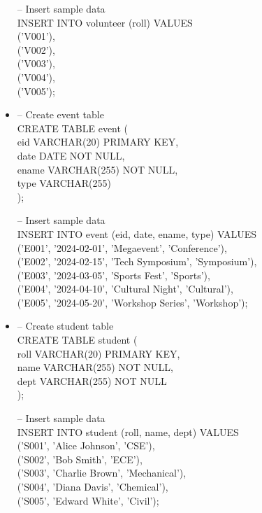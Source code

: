 \documentclass[7pt]{article}
\begin{document}
\begin{itemize}
    -- Insert sample data   \\
    INSERT INTO volunteer (roll) VALUES \\
        ('V001'),   \\
        ('V002'),   \\
        ('V003'),   \\
        ('V004'),   \\
        ('V005');
    
    \item -- Create event table \\
    CREATE TABLE event (    \\
        eid VARCHAR(20) PRIMARY KEY,    \\
        date DATE NOT NULL, \\
        ename VARCHAR(255) NOT NULL,    \\
        type VARCHAR(255)   \\
    );  \vspace{2pt}
    
    -- Insert sample data   \\
    INSERT INTO event (eid, date, ename, type) VALUES   \\
        ('E001', '2024-02-01', 'Megaevent', 'Conference'),  \\
        ('E002', '2024-02-15', 'Tech Symposium', 'Symposium'),  \\
        ('E003', '2024-03-05', 'Sports Fest', 'Sports'),    \\
        ('E004', '2024-04-10', 'Cultural Night', 'Cultural'),   \\
        ('E005', '2024-05-20', 'Workshop Series', 'Workshop'); 

\newpage

    \item -- Create student table   \\
    CREATE TABLE student (              \\
        roll VARCHAR(20) PRIMARY KEY,   \\
        name VARCHAR(255) NOT NULL, \\
        dept VARCHAR(255) NOT NULL  \\
    );  \vspace{2pt}
    
    -- Insert sample data   \\
    INSERT INTO student (roll, name, dept) VALUES   \\
        ('S001', 'Alice Johnson', 'CSE'),   \\
        ('S002', 'Bob Smith', 'ECE'),   \\
        ('S003', 'Charlie Brown', 'Mechanical'),    \\
        ('S004', 'Diana Davis', 'Chemical'),    \\
        ('S005', 'Edward White', 'Civil');


\end{itemize}
\end{document}

